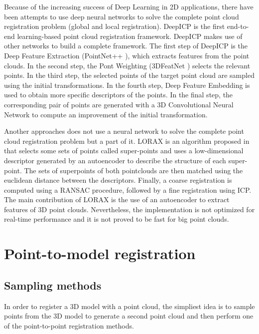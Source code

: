         Because of the increasing success of Deep Learning in 2D applications, there have been attempts to use deep neural networks
        to solve the complete point cloud registration problem (global and local registration).
        DeepICP \cite{Lu_2019_deepicp} is the first end-to-end learning-based point cloud registration framework.
        DeepICP makes use of other networks to build a complete framework.
        The first step of DeepICP is the Deep Feature Extraction (PointNet++ \cite{Qi_2017_pointnet}), which extracts features from the point clouds.
        In the second step, the Pont Weighting (3DFeatNet \cite{Yew_2018_3dfeat}) selects the relevant points.
        In the third step, the selected points of the target point cloud are sampled using the initial transformations.
        In the fourth step, Deep Feature Embedding is used to obtain more specific descriptors of the points.
        In the final step, the corresponding pair of points are generated with a 3D Convolutional Neural Network
        to compute an improvement of the initial transformation.
        
        Another approaches does not use a neural network to solve the complete point cloud registration problem but a part of it.
        LORAX is an algorithm proposed in \cite{Elbaz_2017_3dpoint} that selects some sets of points called super-points and uses a low-dimensional descriptor 
        generated by an autoencoder to describe the structure of each super-point.
        The sets of superpoints of both pointclouds are then matched using the euclidean distance between the descriptors.
        Finally, a coarse registration is computed using a RANSAC procedure, followed by a fine registration using ICP.
        The main contribution of LORAX is the use of an autoencoder to extract features of 3D point clouds. 
        Nevertheless, the implementation is not optimized for real-time performance and it is not proved to be fast for big point clouds.

    \section{Point-to-model registration}

        \subsection{Sampling methods}

        In order to register a 3D model with a point cloud, the simpliest idea is to sample points from the 3D model to generate a second point cloud
        and then perform one of the point-to-point registration methods. 

